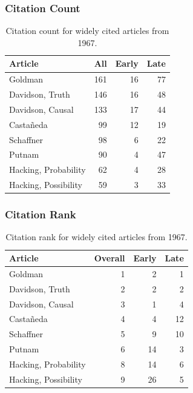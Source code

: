 \documentclass[
  10pt,
  letterpaper,
  DIV=11,
  numbers=noendperiod,
  twoside]{scrartcl}
\begin{document}
\subsubsection*{Citation Count}\label{sec-count-1967}

\begin{longtable}[]{@{}lrrr@{}}

\caption{\label{tbl-citation-count-1967}Citation count for widely cited
articles from 1967.}

\tabularnewline

\toprule\noalign{}
Article & All & Early & Late \\
\midrule\noalign{}
\endhead
\bottomrule\noalign{}
\endlastfoot
Goldman & 161 & 16 & 77 \\
Davidson, Truth & 146 & 16 & 48 \\
Davidson, Causal & 133 & 17 & 44 \\
Castañeda & 99 & 12 & 19 \\
Schaffner & 98 & 6 & 22 \\
Putnam & 90 & 4 & 47 \\
Hacking, Probability & 62 & 4 & 28 \\
Hacking, Possibility & 59 & 3 & 33 \\

\end{longtable}

\subsubsection*{Citation Rank}\label{sec-rank-1967}

\begin{longtable}[]{@{}lrrr@{}}

\caption{\label{tbl-citation-rank-1967}Citation rank for widely cited
articles from 1967.}

\tabularnewline

\toprule\noalign{}
Article & Overall & Early & Late \\
\midrule\noalign{}
\endhead
\bottomrule\noalign{}
\endlastfoot
Goldman & 1 & 2 & 1 \\
Davidson, Truth & 2 & 2 & 2 \\
Davidson, Causal & 3 & 1 & 4 \\
Castañeda & 4 & 4 & 12 \\
Schaffner & 5 & 9 & 10 \\
Putnam & 6 & 14 & 3 \\
Hacking, Probability & 8 & 14 & 6 \\
Hacking, Possibility & 9 & 26 & 5 \\

\end{longtable}
\end{document}
